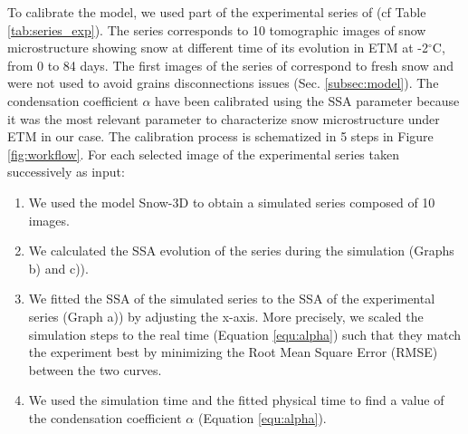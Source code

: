 \documentclass[draft,ms]{agujournal2019}
\begin{document}
To calibrate the model, we used part of the experimental series of  (cf Table \ref{tab:series_exp}).  The series corresponds to 10 tomographic images of snow microstructure showing snow at different time of its evolution in ETM at -2$^\circ$C, from 0 to 84 days. The first images of the series of  correspond to fresh snow and were not used to avoid grains disconnections issues (Sec. \ref{subsec:model}). The condensation coefficient $\alpha$ have been calibrated using the SSA parameter because it was the most relevant parameter to characterize snow microstructure under ETM in our case. The calibration process is schematized in 5 steps in Figure \ref{fig:workflow}. For each selected image of the experimental series taken successively as input: \\
\begin{enumerate}
    \item We used the model Snow-3D to obtain a simulated series composed of 10 images. 
    \item We calculated the SSA evolution of the series during the simulation (Graphs b) and c)).
    \item We fitted the SSA of the simulated series to the SSA of the experimental series (Graph a)) by adjusting the x-axis. More precisely, we scaled the simulation steps to the real time (Equation \eqref{equ:alpha}) such that they match the experiment best by minimizing the Root Mean Square Error (RMSE) between the two curves.   
    \item We used the simulation time and the fitted physical time to find a value of the condensation coefficient $\alpha$ (Equation \eqref{equ:alpha}). 
\end{enumerate}
\end{document}
